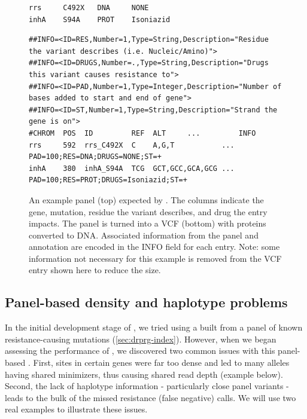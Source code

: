 \begin{figure}
\begin{Verbatim}[frame=single,framerule=0.5mm,label=Panel,fontsize=\footnotesize]
rrs     C492X   DNA     NONE
inhA    S94A    PROT    Isoniazid
\end{Verbatim}
\begin{Verbatim}[frame=single,framerule=0.5mm,label=VCF,fontsize=\footnotesize]
##INFO=<ID=RES,Number=1,Type=String,Description="Residue the variant describes (i.e. Nucleic/Amino)">
##INFO=<ID=DRUGS,Number=.,Type=String,Description="Drugs this variant causes resistance to">
##INFO=<ID=PAD,Number=1,Type=Integer,Description="Number of bases added to start and end of gene">
##INFO=<ID=ST,Number=1,Type=String,Description="Strand the gene is on">
#CHROM  POS  ID         REF  ALT     ...         INFO
rrs     592  rrs_C492X  C    A,G,T           ... PAD=100;RES=DNA;DRUGS=NONE;ST=+
inhA    380  inhA_S94A  TCG  GCT,GCC,GCA,GCG ... PAD=100;RES=PROT;DRUGS=Isoniazid;ST=+
\end{Verbatim}
\caption{An example panel (top) expected by \drprg{}. The columns indicate the gene, mutation, residue the variant describes, and drug the entry impacts. The panel is turned into a VCF (bottom) with proteins converted to DNA. Associated information from the panel and annotation are encoded in the INFO field for each entry. Note: some information not necessary for this example is removed from the VCF entry shown here to reduce the size.}
\label{fig:example-panel}
\end{figure}

\subsection{Panel-based \prg{} density and haplotype problems}
\label{app:panel-prg-issues}

In the initial development stage of \drprg{}, we tried using a \prg{} built from a panel of known resistance-causing mutations (\autoref{sec:drprg-index}). However, when we began assessing the performance of \drprg{}, we discovered two common issues with this panel-based \prg{}. First, sites in certain genes were far too dense and led to many alleles having shared minimizers, thus causing shared read depth (example below). Second, the lack of haplotype information - particularly close panel variants - leads to the bulk of the missed resistance (false negative) calls. We will use two real examples to illustrate these issues.

